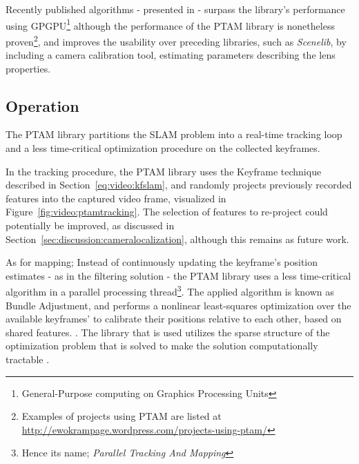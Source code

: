         Recently published algorithms - presented in \citep{Newcombe2011} - surpass
        the library's performance using GPGPU\footnote{General-Purpose computing on Graphics Processing Units}
        although the performance of the PTAM library is nonetheless proven\footnote{Examples of projects using PTAM are listed at \url{http://ewokrampage.wordpress.com/projects-using-ptam/}},
        and improves the usability over preceding libraries, such as \textit{Scenelib}, by including
        a camera calibration tool, estimating parameters describing the lens properties.

        \subsection{Operation}
            The PTAM library partitions the SLAM problem into a real-time tracking
            loop and a less time-critical optimization procedure on the collected keyframes.

            In the tracking procedure, the PTAM library uses the Keyframe
            technique described in Section~\ref{eq:video:kfslam}, and randomly projects
            previously recorded features into the captured video frame,
            visualized in Figure~\ref{fig:video:ptamtracking}.
            The selection of features to re-project could potentially be
            improved, as discussed in Section~\ref{sec:discussion:cameralocalization},
            although this remains as future work.

            As for mapping; Instead of continuously updating the keyframe's position estimates - as in the filtering solution -
            the PTAM library uses a less time-critical algorithm in a parallel processing thread\footnote{Hence its name; \textit{Parallel Tracking And Mapping}}.
            The applied algorithm is known as Bundle Adjustment, and
            performs a nonlinear least-squares optimization over the available keyframes'
            to calibrate their positions relative to each other, based on shared features. \citep{lour09}.
            The library that is used utilizes the sparse structure of the optimization problem that
            is solved to make the solution computationally tractable \citep{Lourakis11bundle}.

